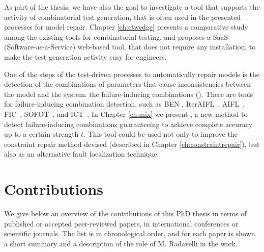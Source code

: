 As part of the thesis, we have also the goal to investigate a tool that supports the activity of combinatorial test generation, that is often used in the presented processes for model repair.
Chapter \ref{ch:ctwedge} presents a comparative study among the existing tools for combinatorial testing, and proposes a SaaS (Software-as-a-Service) web-based tool, that does not require any installation, to make the test generation activity easy for engineers.

One of the steps of the test-driven processes to automatically repair models is the detection of the combinations of parameters that cause inconsistencies between the model and the system: the failure-inducing combinations (\fccs).
There are tools for failure-inducing combination detection, such as BEN \cite{ben_2015,ghandehari2018combinatorial}, IterAIFL~\cite{wang_adaptive_2010}, AIFL~\cite{shi_software_nodate}, FIC~\cite{zhang_characterizing_2011}, SOFOT~\cite{nie_2011}, and ICT~\cite{Niu2018interleaving}.
In Chapter \ref{ch:mix} we present \mix, a new method to detect failure-inducing combinations guaranteeing to achieve complete accuracy up to a certain strength $t$.
This tool could be used not only to improve the constraint repair method devised (described in Chapter \ref{ch:constraintrepair}), but also as an alternative fault localization technique.
	

\section{Contributions}\label{sec:papers}

We give below an overview of the contributions of this PhD thesis in terms of published or accepted peer-reviewed papers, in international conferences or scientific journals.
The list is in chronological order, and for each paper is shown a short summary and a description of the role of M. Radavelli in the work.

